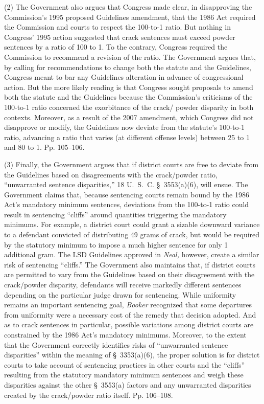   (2) The Government also argues that Congress made clear, in
disapproving the Commission's 1995 proposed Guidelines amendment, that
the 1986 Act required the Commission and courts to respect the 100-to-1
ratio. But nothing in Congress' 1995 action suggested that crack
sentences must exceed powder sentences by a ratio of 100 to 1. To the
contrary, Congress required the Commission to recommend a revision of
the ratio. The Government argues that, by calling for recommendations
to change both the statute and the Guidelines, Congress meant to bar
any Guidelines alteration in advance of congressional action. But the
more likely reading is that Congress sought proposals to amend both
the statute and the Guidelines because the Commission's criticisms
of the 100-to-1 ratio concerned the exorbitance of the crack/ powder
disparity in both contexts. Moreover, as a result of the 2007 amendment,
which Congress did not disapprove or modify, the Guidelines now deviate
from the statute's 100-to-1 ratio, advancing a ratio that varies
(at different offense levels) between 25 to 1 and 80 to 1. Pp.
105--106.

  (3) Finally, the Government argues that if district courts are
free to deviate from the Guidelines based on disagreements with the
crack/powder ratio, ``unwarranted sentence disparities,'' 18
U.~S.~C. \S~3553(a)(6), will ensue. The Government claims that,
because sentencing courts remain bound by the 1986 Act's mandatory
minimum sentences, deviations from the 100-to-1 ratio could result in
sentencing ``cliffs'' around quantities triggering the mandatory
minimums. For example, a district court could grant a sizable downward
variance to a defendant convicted of distributing 49 grams of crack,
but would be required by the statutory minimum to impose a much higher
sentence for only 1 additional gram. The LSD Guidelines approved in
\emph{Neal,} however, create a similar risk of sentencing ``cliffs.''
The Government also maintains that, if district courts are permitted
to vary from the Guidelines based on their disagreement with the
crack/powder disparity, defendants will receive markedly different
sentences depending on the particular judge drawn for sentencing.
While uniformity remains an important sentencing goal, \emph{Booker}
recognized that some departures from uniformity were a necessary cost
of the remedy that decision adopted. And as to crack sentences in
particular, possible variations among district courts are constrained
by the 1986 Act's mandatory minimums. Moreover, to the extent that
the Government correctly identifies risks of ``unwarranted sentence
disparities'' within the meaning of \S~3353(a)(6), the proper solution
is for district courts to take account of sentencing practices in other
courts and the ``cliffs'' resulting from the statutory mandatory
minimum sentences and weigh these disparities \newpage  against the other
\S~3553(a) factors and any unwarranted disparities created by the
crack/powder ratio itself. Pp. 106--108.

